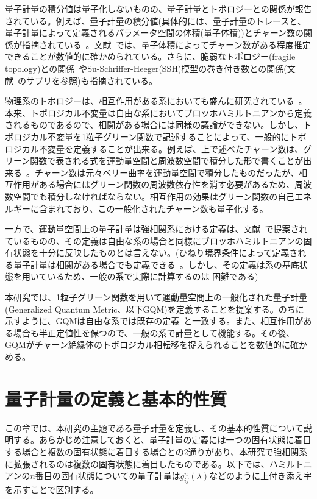 \documentclass[12pt]{jsbook}
\begin{document}
量子計量の積分値は量子化しないものの、量子計量とトポロジーとの関係が報告されている。例えば、量子計量の積分値(具体的には、量子計量のトレースと、量子計量によって定義されるパラメータ空間の体積(量子体積))とチャーン数の関係が指摘されている~\cite{Peotta2015,PhysRevB.104.045103, PhysRevB.103.L241102,Zhang_2022}。文献~\cite{PhysRevB.104.045103}では、量子体積によってチャーン数がある程度推定できることが数値的に確かめられている。さらに、脆弱なトポロジー(fragile topology)との関係~\cite{PhysRevLett.124.167002,PhysRevLett.126.027002}やSu-Schriffer-Heeger(SSH)模型の巻き付き数との関係(文献~\cite{PhysRevLett.124.167002}のサプリを参照)も指摘されている。

物理系のトポロジーは、相互作用がある系においても盛んに研究されている~\cite{Rachel_2018,Hohenadler_2013}。本来、トポロジカル不変量は自由な系においてブロッホハミルトニアンから定義されるものであるので、相関がある場合には同様の議論ができない。しかし、トポロジカル不変量を1粒子グリーン関数で記述することによって、一般的にトポロジカル不変量を定義することが出来る\cite{PhysRevLett.105.256803,PhysRevX.2.031008,article,PhysRevB.92.085126}。例えば、上で述べたチャーン数は、グリーン関数で表される式を運動量空間と周波数空間で積分した形で書くことが出来る~\cite{PhysRevLett.105.256803,PhysRevB.83.085426}。チャーン数は元々ベリー曲率を運動量空間で積分したものだったが、相互作用がある場合にはグリーン関数の周波数依存性を消す必要があるため、周波数空間でも積分しなければならない。相互作用の効果はグリーン関数の自己エネルギーに含まれており、この一般化されたチャーン数も量子化する。

一方で、運動量空間上の量子計量は強相関系における定義は、文献~\cite{10.21468/SciPostPhysCore.5.3.040}で提案されているものの、その定義は自由な系の場合と同様にブロッホハミルトニアンの固有状態を十分に反映したものとは言えない。(ひねり境界条件によって定義される量子計量は相関がある場合でも定義できる~\cite{Resta2011, PhysRevB.62.1666, Raffaele_Resta_2002}。しかし、その定義は系の基底状態を用いているため、一般の系で実際に計算するのは
困難である)

本研究では、1粒子グリーン関数を用いて運動量空間上の一般化された量子計量(Generalized Quantum Metric、以下GQM)を定義することを提案する。のちに示すように、GQMは自由な系では既存の定義~\cite{PhysRevB.56.12847}と一致する。また、相互作用がある場合も半正定値性を保つので、一般の系で計量として機能する。その後、GQMがチャーン絶縁体のトポロジカル相転移を捉えられることを数値的に確かめる。

\chapter{量子計量の定義と基本的性質}
この章では、本研究の主題である量子計量を定義し、その基本的性質について説明する。あらかじめ注意しておくと、量子計量の定義には一つの固有状態に着目する場合と複数の固有状態に着目する場合との2通りがあり、本研究で強相関系に拡張されるのは複数の固有状態に着目したものである。以下では、ハミルトニアンの$n$番目の固有状態についての量子計量は$g_{ij}^{n}(\lambda)$などのように上付き添え字を示すことで区別する。
\end{document}
